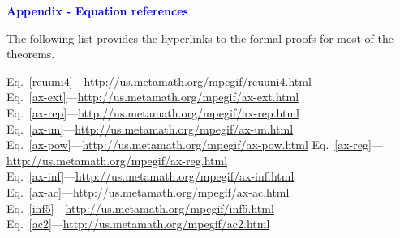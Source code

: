 \documentclass{slides}
\begin{document}
\begin{slide}

\begin{center}
\textcolor{blue}{\textbf{Appendix - Equation references}}
\end{center}

The following list provides the hyperlinks to the formal proofs
for most of the theorems.

Eq.~\ref{reuuni4}---\url{http://us.metamath.org/mpegif/reuuni4.html}     \\
Eq.~\ref{ax-ext}---\url{http://us.metamath.org/mpegif/ax-ext.html} \\
Eq.~\ref{ax-rep}---\url{http://us.metamath.org/mpegif/ax-rep.html} \\
Eq.~\ref{ax-un}---\url{http://us.metamath.org/mpegif/ax-un.html} \\
Eq.~\ref{ax-pow}---\url{http://us.metamath.org/mpegif/ax-pow.html}
Eq.~\ref{ax-reg}---\url{http://us.metamath.org/mpegif/ax-reg.html} \\
Eq.~\ref{ax-inf}---\url{http://us.metamath.org/mpegif/ax-inf.html} \\
Eq.~\ref{ax-ac}---\url{http://us.metamath.org/mpegif/ax-ac.html} \\
Eq.~\ref{inf5}---\url{http://us.metamath.org/mpegif/inf5.html} \\
Eq.~\ref{ac2}---\url{http://us.metamath.org/mpegif/ac2.html} \\

\end{slide}
\end{document}
